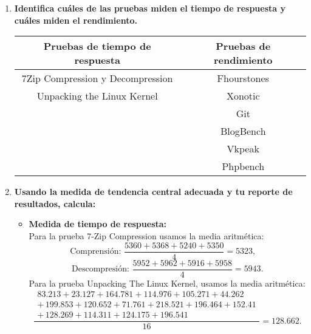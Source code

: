 \documentclass[12pt]{article}
\newcommand{\pl}[1]{\item \textbf{ #1 }}
\begin{document}
\begin{enumerate}[label=(\arabic{section}.\arabic{subsection}.\arabic{enumi})]
    \pl{Identifica cuáles de las pruebas miden el tiempo de respuesta y cuáles miden el rendimiento.}
    \begin{table}[htb]
        \centering
        \begin{tabular}{|c|c|}
        \hline
        Pruebas de tiempo de respuesta & Pruebas de rendimiento \\
        \hline
        7Zip Compression y Decompression & Fhourstones \\
        \hline
        Unpacking the Linux Kernel & Xonotic \\
        \hline
         & Git \\
        \hline
        & BlogBench \\
        \hline
        & Vkpeak \\
        \hline
        & Phpbench \\
        \hline
        \end{tabular}
    \end{table}\par

    \pl{Usando la medida de tendencia central adecuada y tu reporte de resultados, calcula:}
    \begin{itemize}
       \item \textbf{Medida de tiempo de respuesta:} \\
       Para la prueba 7-Zip Compression usamos la media aritmética:
       \[
       \text{Comprensión: } \frac{5360+5368+5240+5350}{4}=5323,\quad
       \]
       \[
       \text{Descompresión: } \frac{5952+5962+5916+5958}{4}=5943.
       \]
       Para la prueba Unpacking The Linux Kernel, usamos la media aritmética:
       \[
       \frac{
       	\begin{split}
       		83.213 + 23.127 + 164.781 + 114.976 + 105.271 + 44.262 \\
       		+\, 199.853 + 120.652 + 71.761 + 218.521 + 196.464 + 152.41 \\
       		+\, 128.269 + 114.311 + 124.175 + 196.541
       	\end{split}
       }{16} = 128.662.
       \]
       

\end{itemize}
\end{enumerate}
\end{document}
